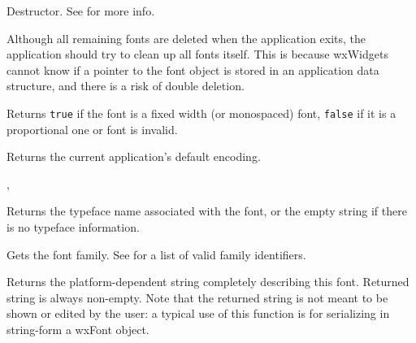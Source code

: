 Destructor.
See  for more info.


Although all remaining fonts are deleted when the application exits,
the application should try to clean up all fonts itself. This is because
wxWidgets cannot know if a pointer to the font object is stored in an
application data structure, and there is a risk of double deletion.


\label{wxfontisfixedwidth}


Returns {\tt true} if the font is a fixed width (or monospaced) font,
{\tt false} if it is a proportional one or font is invalid.


\label{wxfontgetdefaultencoding}


Returns the current application's default encoding.


,


\label{wxfontgetfacename}


Returns the typeface name associated with the font, or the empty string if there is no
typeface information.




\label{wxfontgetfamily}


Gets the font family. See  for a list of valid
family identifiers.




\label{wxfontgetnativefontinfodesc}


Returns the platform-dependent string completely describing this font.
Returned string is always non-empty.
Note that the returned string is not meant to be shown or edited by the user: a typical
use of this function is for serializing in string-form a wxFont object.

